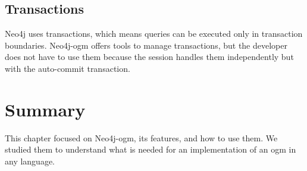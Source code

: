 \subsection{Transactions}

Neo4j uses transactions, which means queries can be executed only in transaction boundaries. Neo4j-\acrshort{ogm}
offers tools to manage transactions, but the developer does not have to use them because the session handles them independently but with the auto-commit transaction.

\section{Summary}

This chapter focused on Neo4j-\acrshort{ogm}, its features, and how to use them. We studied them to understand what is needed for
an implementation of an \acrshort{ogm} in any language.